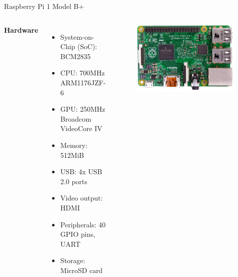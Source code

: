 \documentclass[10pt]{beamer}
\begin{document}
\begin{frame}{Raspberry Pi 1 Model B+}
    \begin{columns}
        \textbf{Hardware}
        \begin{itemize}
            \item System-on-Chip (SoC): BCM2835
            \item CPU: 700MHz ARM1176JZF-6
            \item GPU: 250MHz Broadcom VideoCore IV
            \item Memory: 512MiB
            \item USB: 4x USB 2.0 ports
            \item Video output: HDMI
            \item Peripherals: 40 GPIO pins, UART
            \item Storage: MicroSD card
        \end{itemize}

        \begin{figure}[h]
            \includegraphics[width=.8\textwidth]{raspi.png}
        \end{figure}
    \end{columns} ~\\

     \\
     \\
         \\
\end{frame}
\end{document}
